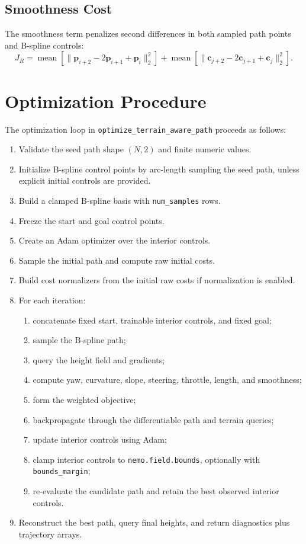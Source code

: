 \documentclass[11pt]{article}
\begin{document}
\subsection{Smoothness Cost}

The smoothness term penalizes second differences in both sampled path points and B-spline controls:
\[
  J_R =
  \operatorname{mean}\left[\|\mathbf{p}_{i+2}-2\mathbf{p}_{i+1}+\mathbf{p}_{i}\|_2^2\right]
  +
  \operatorname{mean}\left[\|\mathbf{c}_{j+2}-2\mathbf{c}_{j+1}+\mathbf{c}_{j}\|_2^2\right].
\]

\section{Optimization Procedure}

The optimization loop in \texttt{optimize\_terrain\_aware\_path} proceeds as follows:

\begin{enumerate}[leftmargin=*]
  \item Validate the seed path shape \((N,2)\) and finite numeric values.
  \item Initialize B-spline control points by arc-length sampling the seed path, unless explicit initial controls are provided.
  \item Build a clamped B-spline basis with \texttt{num\_samples} rows.
  \item Freeze the start and goal control points.
  \item Create an Adam optimizer over the interior controls.
  \item Sample the initial path and compute raw initial costs.
  \item Build cost normalizers from the initial raw costs if normalization is enabled.
  \item For each iteration:
    \begin{enumerate}
      \item concatenate fixed start, trainable interior controls, and fixed goal;
      \item sample the B-spline path;
      \item query the height field and gradients;
      \item compute yaw, curvature, slope, steering, throttle, length, and smoothness;
      \item form the weighted objective;
      \item backpropagate through the differentiable path and terrain queries;
      \item update interior controls using Adam;
      \item clamp interior controls to \texttt{nemo.field.bounds}, optionally with \texttt{bounds\_margin};
      \item re-evaluate the candidate path and retain the best observed interior controls.
    \end{enumerate}
  \item Reconstruct the best path, query final heights, and return diagnostics plus trajectory arrays.
\end{enumerate}
\end{document}

